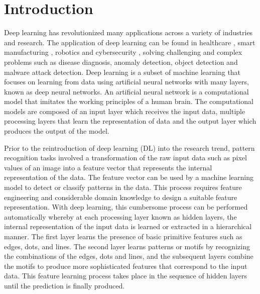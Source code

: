 \documentclass[preprint,12pt]{elsarticle}
\begin{document}


\section{Introduction}\label{sec1}
Deep learning has revolutionized many applications across a variety of industries and research. The application of deep learning can be found in healthcare \cite{shamshirband_review_2021}, smart manufacturing \cite{wang_deep_2018}, robotics \cite{pierson_deep_2017} and cybersecurity \cite{dixit_deep_2021}, solving challenging and complex problems such as disease diagnosis, anomaly detection, object detection and malware attack detection. Deep learning is a subset of machine learning that focuses on learning from data using artificial neural networks with many layers, known as deep neural networks. An artificial neural network is a computational model that imitates the working principles of a human brain. The computational models are composed of an input layer which receives the input data, multiple processing layers that learn the representation of data and the output layer which produces the output of the model.

Prior to the reintroduction of deep learning (DL) into the research trend, pattern recognition tasks involved a transformation of the raw input data such as pixel values of an image into a feature vector that represents the internal representation of the data. The feature vector can be used by a machine learning model to detect or classify patterns in the data. This process requires feature engineering and considerable domain knowledge to design a suitable feature representation. With deep learning, this cumbersome process can be performed automatically whereby at each processing layer known as hidden layers, the internal representation of the input data is learned or extracted in a hierarchical manner. The first layer learns the presence of basic primitive features such as edges, dots, and lines. The second layer learns patterns or motifs by recognizing the combinations of the edges, dots and lines, and the subsequent layers combine the motifs to produce more sophisticated features that correspond to the input data. This feature learning process takes place in the sequence of hidden layers until the prediction is finally produced. 
\end{document}
